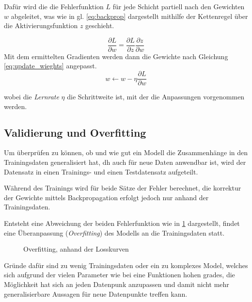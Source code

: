 Dafür wird die die Fehlerfunktion $L$ für jede Schicht partiell nach den 
Gewichten $w$ abgeleitet, was wie in gl. \ref{eq:backprop} dargestellt mithilfe der 
Kettenregel über die Aktivierungsfunktion $z$ geschieht.


\begin{equation}
    \label{eq:backprop}
    \frac{\partial L}{\partial w} = \frac{\partial L}{\partial z}\frac{\partial z}{\partial w}
\end{equation}
Mit dem ermittelten Gradienten werden dann die Gewichte nach Gleichung \ref{eq:update_wieghts} angepasst.
\begin{equation}
    \label{eq:update_wieghts}
    w  \leftarrow w - \eta \frac{\partial L}{\partial w}
\end{equation}

wobei die \textit{Lernrate} $\eta$ die Schrittweite ist, mit der die
Anpassungen vorgenommen werden.





\subsection{Validierung und Overfitting}\label{subsec:validation}

Um überprüfen zu können, ob und wie gut ein Modell die Zusammenhänge
in den Trainingsdaten generalisiert hat, dh auch für neue Daten
anwendbar ist,
wird der Datensatz in einen Trainings- und einen Testdatensatz aufgeteilt.

Während des Trainings wird für beide Sätze der Fehler berechnet, 
die korrektur der Gewichte mittels Backpropagation erfolgt
jedoch nur anhand der Trainingsdaten.

Entsteht eine Abweichung der beiden Fehlerfunktion wie in 
\ref{fig:overfitting} dargestellt, findet eine Überanpassung 
(\textit{Overfitting}) des Modells an die Trainingsdaten statt.

\vspace{2cm}
\begin{figure}[H]
    \centering
    \def\svgwidth{0.5\textwidth}
    
    \caption{Overfitting, anhand der Losskurven}
    \label{fig:overfitting}
\end{figure}

Gründe dafür sind zu wenig Trainingsdaten oder ein zu komplexes Model, 
welches sich aufgrund der vielen Parameter wie bei eine Funktionen hohen
grades, die Möglichkeit hat sich an jeden Datenpunk 
anzupassen und damit nicht mehr generalisierbare Aussagen 
für neue Datenpunkte treffen kann.

